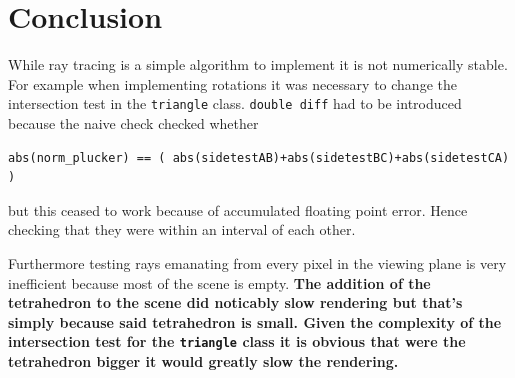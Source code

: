 \documentclass[12pt]{article}
\begin{document}
\section{Conclusion}

While ray tracing is a simple algorithm to implement it is not numerically stable. For example when implementing rotations it was necessary to change the intersection test in the \texttt{triangle} class. \texttt{double diff} had to be introduced because the naive check checked whether 

\begin{lstlisting}
abs(norm_plucker) == ( abs(sidetestAB)+abs(sidetestBC)+abs(sidetestCA) ) 
\end{lstlisting}
but this ceased to work because of accumulated floating point error. Hence checking that they were within an interval of each other. 

Furthermore testing rays emanating from every pixel in the viewing plane is very inefficient because most of the scene is empty. \textbf{The addition of the tetrahedron to the scene did noticably slow rendering but that's simply because said tetrahedron is small. Given the complexity of the intersection test for the \texttt{triangle} class it is obvious that were the tetrahedron bigger it would greatly slow the rendering.}


\end{document}
